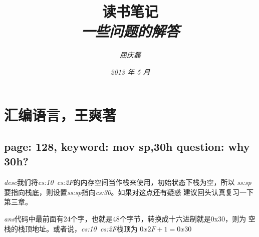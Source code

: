 \documentclass{article}
\begin{document}
\title{
  {\huge \textsf{读书笔记}\\\smallskip}
  {\small \textit{一些问题的解答}}
}

\author{\textit{屈庆磊}\\[2mm]
       }

\date{\textit{2013 年 5 月}}

\maketitle
\newpage
\begin{multicols}{2}
\tableofcontents
\end{multicols}
\newpage 

\section{汇编语言，王爽著}
\subsection{page: 128, keyword: mov sp,30h question: why 30h?}
\emph{desc}我们将\textit{cs:10~cs:2F}的内存空间当作栈来使用，初始状态下栈为空，所以
\textit{ss:sp}要指向栈底，则设置\textit{ss:sp}指向\textit{cs:30}。如果对这点还有疑惑
建议回头认真复习一下第三章。

\indent\emph{ans}代码中最前面有24个字，也就是48个字节，转换成十六进制就是0x30，则为
空栈的栈顶地址。或者说，\textit{cs:10~cs:2F}栈顶为 \bf{$0x2F + 1 = 0x30$}
\end{document}
